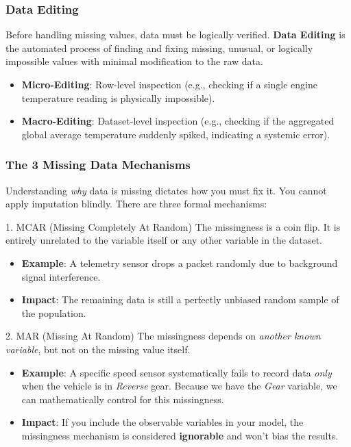 \documentclass[11pt]{article}
\theoremstyle{smallexample}
\begin{document}
\subsubsection{Data Editing}

Before handling missing values, data must be logically verified. \textbf{Data Editing} is the automated process of finding and fixing missing, unusual, or logically impossible values with minimal modification to the raw data.
\begin{itemize}
    \item \textbf{Micro-Editing}: Row-level inspection (e.g., checking if a single engine temperature reading is physically impossible).
    \item \textbf{Macro-Editing}: Dataset-level inspection (e.g., checking if the aggregated global average temperature suddenly spiked, indicating a systemic error).
\end{itemize}

\subsubsection{The 3 Missing Data Mechanisms}

Understanding \textit{why} data is missing dictates how you must fix it. You cannot apply imputation blindly. There are three formal mechanisms:


\begin{defbox}{1. MCAR (Missing Completely At Random)}
    The missingness is a coin flip. It is entirely unrelated to the variable itself or any other variable in the dataset.
    \begin{itemize}
        \item \textbf{Example}: A telemetry sensor drops a packet randomly due to background signal interference.
        \item \textbf{Impact}: The remaining data is still a perfectly unbiased random sample of the population.
    \end{itemize}
\end{defbox}

\begin{defbox}{2. MAR (Missing At Random)}
    The missingness depends on \textit{another known variable}, but not on the missing value itself.
    \begin{itemize}
        \item \textbf{Example}: A specific speed sensor systematically fails to record data \textit{only} when the vehicle is in \textit{Reverse} gear. Because we have the \textit{Gear} variable, we can mathematically control for this missingness.
        \item \textbf{Impact}: If you include the observable variables in your model, the missingness mechanism is considered \textbf{ignorable} and won't bias the results.
    \end{itemize}
\end{defbox}
\end{document}
